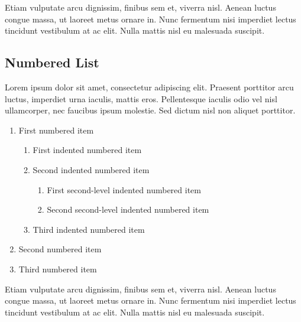 \documentclass[
	a4paper, %
	12pt, %
]{include/CSSullivanBusinessReport}
\begin{document}
Etiam vulputate arcu dignissim, finibus sem et, viverra nisl. Aenean luctus congue massa, ut laoreet metus ornare in. Nunc fermentum nisi imperdiet lectus tincidunt vestibulum at ac elit. Nulla mattis nisl eu malesuada suscipit.


\subsection{Numbered List}

Lorem ipsum dolor sit amet, consectetur adipiscing elit. Praesent porttitor arcu luctus, imperdiet urna iaculis, mattis eros. Pellentesque iaculis odio vel nisl ullamcorper, nec faucibus ipsum molestie. Sed dictum nisl non aliquet porttitor.

\begin{enumerate}
	\item First numbered item
	\begin{enumerate}
		\item First indented numbered item
		\item Second indented numbered item
		\begin{enumerate}
			\item First second-level indented numbered item
			\item Second second-level indented numbered item
		\end{enumerate}
		\item Third indented numbered item
	\end{enumerate}
	\item Second numbered item
	\item Third numbered item
\end{enumerate}

Etiam vulputate arcu dignissim, finibus sem et, viverra nisl. Aenean luctus congue massa, ut laoreet metus ornare in. Nunc fermentum nisi imperdiet lectus tincidunt vestibulum at ac elit. Nulla mattis nisl eu malesuada suscipit.
\end{document}
